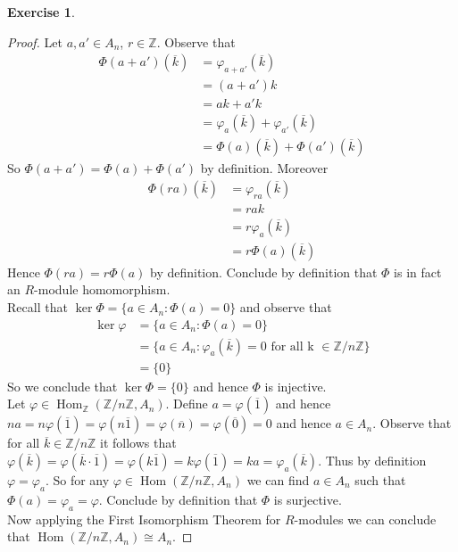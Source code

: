 \documentclass[8pt]{amsart}
\theoremstyle{plain}%
\theoremstyle{definition}
\newtheorem{exercise}{Exercise}[section]
\theoremstyle{remark}
\numberwithin{equation}{section}
\newcommand{\Z}{\mathbb{Z}}
\begin{document}
\begin{exercise}
\begin{proof}
		Let $a, a' \in A_n$, $r \in \Z$. Observe that
		\begin{align*}
			\Phi(a + a')(\overline k)&= \varphi_{a + a'}(\overline k)\\
			&= (a + a')k\\
			&= ak + a'k\\
			&= \varphi_a(\overline k) + \varphi_{a'}(\overline k)\\
			&= \Phi(a)(\overline k) + \Phi(a')(\overline k)
		\end{align*}
		So $\Phi(a + a') = \Phi(a) + \Phi(a')$ by definition. Moreover
		\begin{align*}
			\Phi(ra)(\overline k) &= \varphi_{ra}(\overline k)\\
			&= rak\\
			&= r\varphi_{a}(\overline k)\\
			&= r\Phi(a)(\overline k)
		\end{align*}
		Hence $\Phi(ra) = r\Phi(a)$ by definition. Conclude by definition that $\Phi$ is in fact an $R$-module homomorphism.\\

		Recall that $\ker \Phi = \{a \in A_n : \Phi(a) = 0\}$ and observe that
		\begin{align*}
			\ker \varphi &= \{a \in A_n : \Phi(a) = 0\}\\
			&= \{a \in A_n : \varphi_a(\overline k) = 0 \text{ for all k } \in \Z/n\Z\}\\
			&= \{0\}
		\end{align*}
		So we conclude that $\ker \Phi = \{0\}$ and hence $\Phi$ is injective.\\

		Let $\varphi \in \operatorname{Hom}_\Z(\Z/n\Z, A_n)$. Define $a = \varphi(\overline 1)$ and hence $na = n\varphi(\overline 1) = \varphi(n \overline 1) = \varphi(\overline n) = \varphi(\overline 0) = 0$ and hence $a \in A_n$. Observe that for all $\overline k \in \Z/n\Z$ it follows that $\varphi(\overline k) = \varphi(\overline k \cdot \overline 1) = \varphi(k \overline 1) = k \varphi(\overline 1) = ka = \varphi_a(\overline k)$. Thus by definition $\varphi = \varphi_a$. So for any $\varphi \in \operatorname{Hom}(\Z/n\Z, A_n)$ we can find $a \in A_n$ such that $\Phi(a) = \varphi_a = \varphi$. Conclude by definition that $\Phi$ is surjective.\\

		Now applying the First Isomorphism Theorem for $R$-modules we can conclude that $\operatorname{Hom}(\Z/n\Z, A_n) \cong A_n$.
	\end{proof}
\end{exercise}
\end{document}
